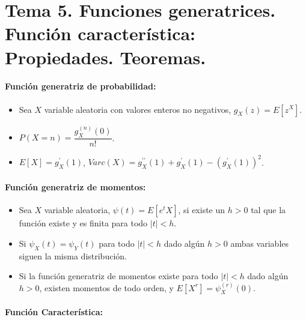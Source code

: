 \documentclass[oneside,spanish,a4paper]{article}
\newcommand{\sectioncol}[1]{\section{{\color{blue} #1}}}
\begin{document}
\sectioncol{Tema 5. Funciones generatrices. Funci\'on caracter\'istica: Propiedades. Teoremas.}
\paragraph{Funci\'on generatriz de probabilidad:}

\begin{itemize}
\item Sea $X$ variable aleatoria con valores enteros no negativos, $g_X(z)=E[z^X]$.
\item $P(X=n)=\dfrac{g_X^{(n)}(0)}{n!}$.
\item $E[X]=g_X^{\prime}(1)$, $Varc(X)=g_X^{\prime\prime}(1)+g_X^{\prime}(1)-(g_X^{\prime}(1))^2$.
\end{itemize}

\paragraph{Funci\'on generatriz de momentos:}

\begin{itemize}
\item Sea $X$ variable aleatoria, $\psi(t)=E[e^tX]$, si existe un $h>0$ tal que la funci\'on existe y es finita para todo $|t|<h$.
\item Si $\psi_X(t)=\psi_Y(t)$ para todo $|t|<h$ dado alg\'un $h>0$ ambas variables siguen la misma distribuci\'on.
\item Si la funci\'on generatriz de momentos existe para todo $|t|<h$ dado alg\'un $h>0$, existen momentos de todo orden, y $E[X^r]=\psi_X^{(r)}(0)$.
\end{itemize}

\paragraph{Funci\'on Caracter\'istica:}
\end{document}
